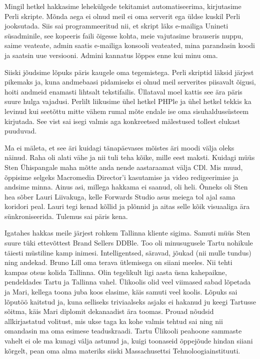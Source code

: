Mingil hetkel hakkasime lehekülgede tekitamist automatiseerima, kirjutasime 
Perli skripte. Mõnda aega ei olnud meil ei oma serverit ega üldse kuskil Perli 
jooksutada. Siis sai programmeeritud nii, et skript läks e-mailiga 
Unineti süsadminile, see kopeeris faili õigesse kohta, meie 
vajutasime brauseris nuppu, saime veateate, admin saatis e-mailiga konsooli 
veateated, mina parandasin koodi ja saatsin uue versiooni. Admini kannatus 
lõppes enne kui minu oma. 

Siiski jõudsime lõpuks päris kaugele oma tegemistega. Perli skriptid läksid 
järjest pikemaks ja, kuna andmebaasi pidamiseks ei olnud meil serverites 
piisavalt õigusi, hoiti andmeid enamasti lihtsalt tekstifailis. Üllataval moel 
kattis see ära päris suure hulga vajadusi. Perlilt liikusime ühel hetkel PHPle 
ja ühel hetkel tekkis ka levinud kui seetõttu mitte vähem rumal mõte endale ise 
oma sisuhaldussüsteem kirjutada. See vist sai isegi valmis aga konkreetsed 
mälestused tollest elukast puuduvad. 

Ma ei mäleta, et see äri kuidagi tänapäevases mõistes äri moodi välja oleks 
näinud. Raha oli alati vähe ja nii tuli teha kõike, mille eest maksti. Kuidagi 
müüs Sten Ühispangale maha mõtte anda nende aastaraamat välja CDl. Mis muud, 
õppisime selgeks Macromedia Director'i kasutamise ja video redigeerimise ja 
andsime minna. Ainus asi, millega hakkama ei saanud, oli heli. Õnneks oli Sten 
hea sõber Lauri Liivakuga, kelle Forwards 
Studio asus meiega tol ajal sama koridori peal. Lauri 
tegi kenad kõllid ja plõnnid ja aitas selle kõik visuaaliga ära 
sünkroniseerida. Tulemus sai päris kena. 

Igatahes hakkas meile järjest rohkem Tallinna kliente sigima. Samuti müüs Sten 
suure tüki ettevõttest Brand Sellers DDBle. Too oli 
minusugusele Tartu nohikule täiesti müstiline kamp inimesi. Intelligentsed, 
säravad, jõukad (nii mulle tundus) ning andekad. Bruno Lill oma terava ütlemisega on siiani meeles.  Nii tehti kampas otsus kolida 
Tallinna. Olin tegelikult ligi aasta üsna kahepaikne, pendeldades Tartu ja 
Tallinna vahel. Ülikoolis olid veel viimased sabad lõpetada ja 
Mari, kellega toona juba koos elasime, käis samuti veel 
koolis. Lõpuks sai lõputöö kaitstud ja, kuna selliseks triviaalseks asjaks ei 
hakanud ju keegi Tartusse sõitma, käis Mari diplomit dekanaadist ära toomas. 
Prouad nõudsid allkirjastatud volitust, mis ukse taga ka kohe valmis tehtud sai 
ning nii omandasin ma oma esimese teaduskraadi. Tartu Ülikooli peahoone 
sammaste vahelt ei ole ma kunagi välja astunud ja, kuigi toonaseid õppejõude 
hindan siiani kõrgelt, pean oma alma materiks siiski Massachusettsi 
Tehnoloogiainstituuti. 

